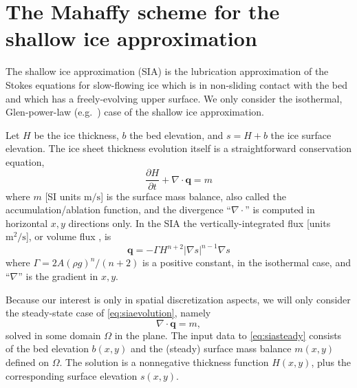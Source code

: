 \documentclass[11pt]{amsart}
\newcommand\bq{\mathbf{q}}
\newcommand{\Div}{\nabla\cdot}
\newcommand{\grad}{\nabla}
\begin{document}
\section{The Mahaffy scheme for the shallow ice approximation}  The shallow ice approximation (SIA) \cite{Hutter1983} is the lubrication approximation \cite{Fowler1997} of the Stokes equations for slow-flowing ice which is in non-sliding contact with the bed and which has a freely-evolving upper surface.  We only consider the isothermal, Glen-power-law (e.g.~\cite{GreveBlatter2009}) case of the shallow ice approximation.

Let $H$ be the ice thickness, $b$ the bed elevation, and $s = H+b$ the ice surface elevation.  The ice sheet thickness evolution itself is a straightforward conservation equation,
\begin{equation}
\frac{\partial H}{\partial t} + \Div \bq = m  \label{eq:siaevolution}
\end{equation}
where $m$ [SI units $\text{m}/\text{s}$] is the surface mass balance, also called the accumulation/ablation function, and the divergence ``$\Div$'' is computed in horizontal $x,y$ directions only.  In the SIA the vertically-integrated flux [units $\text{m}^2/\text{s}$], or volume flux \cite{GreveBlatter2009}, is
\begin{equation}
\bq = - \Gamma H^{n+2} |\grad s|^{n-1} \grad s  \label{eq:siaflux}
\end{equation}
where $\Gamma = 2 A (\rho g)^n / (n+2)$ is a positive constant, in the isothermal case, and ``$\grad$'' is the gradient in $x,y$.

Because our interest is only in spatial discretization aspects, we will only consider the steady-state case of \eqref{eq:siaevolution}, namely
\begin{equation}
\Div \bq = m,  \label{eq:siasteady}
\end{equation}
solved in some domain $\Omega$ in the plane.  The input data to \eqref{eq:siasteady} consists of the bed elevation $b(x,y)$ and the (steady) surface mass balance $m(x,y)$ defined on $\Omega$.  The solution is a nonnegative thickness function $H(x,y)$, plus the corresponding surface elevation $s(x,y)$.
\end{document}
